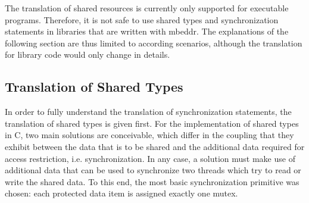 \vspace*{4mm}

The translation of shared resources is currently only supported for executable programs. Therefore, it is not safe to use shared types and synchronization statements in libraries that are written with mbeddr. The explanations of the following section are thus limited to according scenarios, although the translation for library code would only change in details.

\subsection{Translation of Shared Types}
\label{sharedTypesTranslation}
In order to fully understand the translation of synchronization statements, the translation of shared types is given first. For the implementation of shared types in C, two main solutions are conceivable, which differ in the coupling that they exhibit between the data that is to be shared and the additional data required for access restriction, i.e. synchronization. In any case, a solution must make use of additional data that can be used to synchronize two threads which try to read or write the shared data. To this end, the most basic synchronization primitive was chosen: each protected data item is assigned exactly one mutex. 

